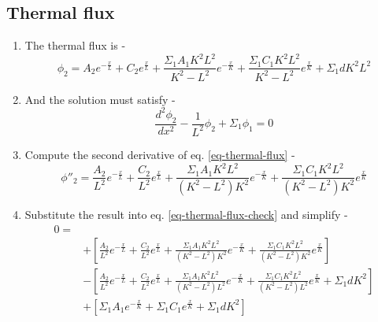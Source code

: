 \documentclass[11pt,a4paper]{article}
\begin{document}
\subsection{Thermal flux}
\begin{enumerate}[leftmargin=*,topsep=0pt]
    \item The thermal flux is - 
        \begin{equation} \label{eq-thermal-flux}
            \phi_2=A_2e^{-\frac{x}{L}}+C_2e^{\frac{x}{L}}+\frac{\Sigma_1 A_1 K^2 L^2}{K^2-L^2} e^{-\frac{x}{K}}+\frac{\Sigma_1 C_1 K^2 L^2}{K^2-L^2} e^{\frac{x}{K}}+\Sigma_1 d K^2 L^2
        \end{equation}
    \item And the solution must satisfy - 
        \begin{equation} \label{eq-thermal-flux-check}
            \frac{d^2\phi_2}{dx^2}-\frac{1}{L^2}\phi_2+\Sigma_1\phi_1=0
        \end{equation}
    \item Compute the second derivative of eq. \ref{eq-thermal-flux} - 
        \begin{equation}
            \phi''_2=\frac{A_2}{L^2}e^{-\frac{x}{L}}+\frac{C_2}{L^2}e^{\frac{x}{L}}+\frac{\Sigma_1 A_1 K^2 L^2}{(K^2-L^2)K^2} e^{-\frac{x}{K}}+\frac{\Sigma_1 C_1 K^2 L^2}{(K^2-L^2)K^2} e^{\frac{x}{K}}
        \end{equation}
    \item Substitute the result into eq. \ref{eq-thermal-flux-check} and simplify - 
        \begin{equation*}
            \begin{aligned}
                0=\\
                & +[\frac{A_2}{L^2}e^{-\frac{x}{L}}+\frac{C_2}{L^2}e^{\frac{x}{L}}+\frac{\Sigma_1 A_1 K^2 L^2}{(K^2-L^2)K^2} e^{-\frac{x}{K}}+\frac{\Sigma_1 C_1 K^2 L^2}{(K^2-L^2)K^2} e^{\frac{x}{K}}] \\
                & -[\frac{A_2}{L^2}e^{-\frac{x}{L}}+\frac{C_2}{L^2}e^{\frac{x}{L}}+\frac{\Sigma_1 A_1 K^2 L^2}{(K^2-L^2)L^2} e^{-\frac{x}{K}}+\frac{\Sigma_1 C_1 K^2 L^2}{(K^2-L^2)L^2} e^{\frac{x}{K}}+\Sigma_1 d K^2] \\
                & +[\Sigma_1A_1e^{-\frac{x}{K}}+\Sigma_1C_1e^{\frac{x}{K}}+\Sigma_1dK^2]
            \end{aligned}
        \end{equation*}
        \begin{equation*}
            \begin{aligned}

\end{aligned}
\end{equation*}
\end{enumerate}
\end{document}
